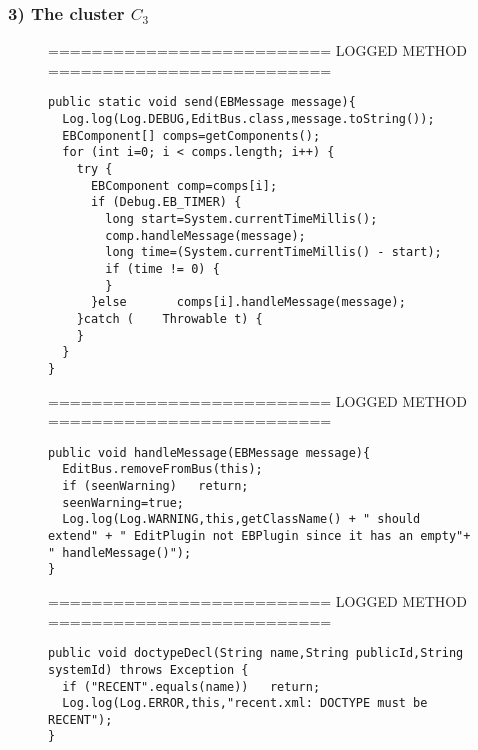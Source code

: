 \subsubsection {\textbf{3) The cluster $C_3$}}

\begin{figure}[p]
\def\baselinestretch{1}

========================== LOGGED METHOD ==========================
\begin{lstlisting}
public static void send(EBMessage message){
  Log.log(Log.DEBUG,EditBus.class,message.toString());
  EBComponent[] comps=getComponents();
  for (int i=0; i < comps.length; i++) {
    try {
      EBComponent comp=comps[i];
      if (Debug.EB_TIMER) {
        long start=System.currentTimeMillis();
        comp.handleMessage(message);
        long time=(System.currentTimeMillis() - start);
        if (time != 0) {
        }
      }else       comps[i].handleMessage(message);
    }catch (    Throwable t) {
    }
  }
}
\end{lstlisting}

========================== LOGGED METHOD ==========================
\begin{lstlisting}
public void handleMessage(EBMessage message){
  EditBus.removeFromBus(this);
  if (seenWarning)   return;
  seenWarning=true;
  Log.log(Log.WARNING,this,getClassName() + " should extend" + " EditPlugin not EBPlugin since it has an empty"+ " handleMessage()");
}
\end{lstlisting}

========================== LOGGED METHOD ==========================
\begin{lstlisting}
public void doctypeDecl(String name,String publicId,String systemId) throws Exception {
  if ("RECENT".equals(name))   return;
  Log.log(Log.ERROR,this,"recent.xml: DOCTYPE must be RECENT");
}
\end{lstlisting}
\end{figure}
